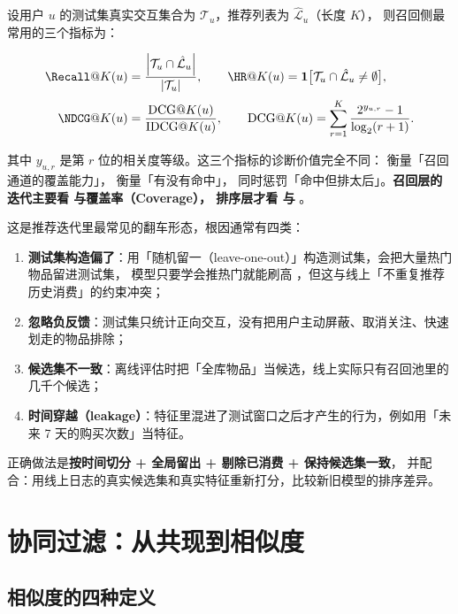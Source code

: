 设用户 $u$ 的测试集真实交互集合为 $\mathcal{T}_u$，推荐列表为 $\hat{\mathcal{L}}_u$（长度 $K$），
则召回侧最常用的三个指标为：

\begin{align}
\Recall@K(u) &= \frac{\abs{\mathcal{T}_u \cap \hat{\mathcal{L}}_u}}{\abs{\mathcal{T}_u}},
\qquad
\HR@K(u) = \mathbf{1}\big[ \mathcal{T}_u \cap \hat{\mathcal{L}}_u \ne \emptyset \big],
\label{eq:recall-hr} \\[2pt]
\NDCG@K(u) &= \frac{\mathrm{DCG}@K(u)}{\mathrm{IDCG}@K(u)},
\qquad
\mathrm{DCG}@K(u) = \sum_{r=1}^{K} \frac{2^{y_{u,r}} - 1}{\log_2 (r + 1)} .
\label{eq:ndcg@k}
\end{align}

其中 $y_{u,r}$ 是第 $r$ 位的相关度等级。这三个指标的诊断价值完全不同：
 衡量「召回通道的覆盖能力」， 衡量「有没有命中」，
 同时惩罚「命中但排太后」。\textbf{召回层的迭代主要看  与覆盖率（Coverage），
排序层才看  与 }。

\begin{pitfall}
这是推荐迭代里最常见的翻车形态，根因通常有四类：
\begin{enumerate}
  \item \textbf{测试集构造偏了}：用「随机留一（leave-one-out）」构造测试集，会把大量热门物品留进测试集，
        模型只要学会推热门就能刷高 ，但这与线上「不重复推荐历史消费」的约束冲突；
  \item \textbf{忽略负反馈}：测试集只统计正向交互，没有把用户主动屏蔽、取消关注、快速划走的物品排除；
  \item \textbf{候选集不一致}：离线评估时把「全库物品」当候选，线上实际只有召回池里的几千个候选；
  \item \textbf{时间穿越（leakage）}：特征里混进了测试窗口之后才产生的行为，例如用「未来 7 天的购买次数」当特征。
\end{enumerate}
正确做法是\textbf{按时间切分 + 全局留出 + 剔除已消费 + 保持候选集一致}，
并配合：用线上日志的真实候选集和真实特征重新打分，比较新旧模型的排序差异。
\end{pitfall}

\section{协同过滤：从共现到相似度}

\subsection{相似度的四种定义}

